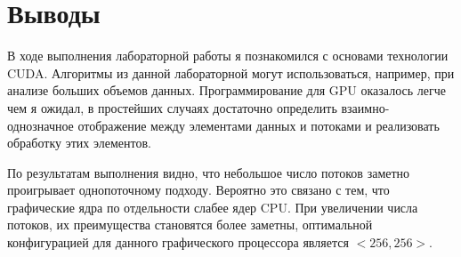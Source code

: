 \section{Выводы}
В ходе выполнения лабораторной работы я познакомился с основами технологии CUDA. 
Алгоритмы из данной лабораторной могут использоваться, например, при анализе больших объемов данных. 
Программирование для GPU оказалось легче чем я ожидал, в простейших случаях достаточно определить взаимно-однозначное отображение между элементами данных и потоками
 и реализовать обработку этих элементов.

По результатам выполнения видно, что небольшое число потоков заметно проигрывает однопоточному подходу. 
Вероятно это связано с тем, что графические ядра по отдельности слабее ядер CPU. 
При увеличении числа потоков, их преимущества становятся более заметны, оптимальной конфигурацией для данного графического процессора является $<256, 256>$.

\pagebreak
